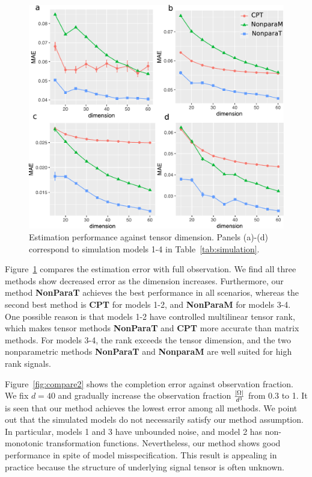 \documentclass{article}
\theoremstyle{plain}
\theoremstyle{definition}
\begin{document}
\begin{figure}[h!]
\includegraphics[width=.45\textwidth]{figure/fig1-4.pdf}
\vspace{-.4cm}
\caption{Estimation performance against tensor dimension. Panels (a)-(d) correspond to simulation models 1-4 in Table~\ref{tab:simulation}.}\label{fig:compare1}
\vspace{-.2cm}
\end{figure}


Figure~\ref{fig:compare1} compares the estimation error with full observation. We find all three methods show decreased error as the dimension increases. Furthermore, our method {\bf NonParaT} achieves the best performance in all scenarios, whereas the second best method is {\bf CPT} for models 1-2, and {\bf NonParaM} for models 3-4. One possible reason is that models 1-2 have controlled multilinear tensor rank, which makes tensor methods {\bf NonParaT} and {\bf CPT} more accurate than matrix methods. For models 3-4, the rank exceeds the tensor dimension, and the two nonparametric methods {\bf NonParaT} and {\bf NonparaM} are well suited for high rank signals. 



Figure~\ref{fig:compare2} shows the completion error against observation fraction. We fix $d=40$ and gradually increase the observation fraction ${|\Omega|\over d^3}$ from 0.3 to 1. It is seen that our method achieves the lowest error among all methods. %
We point out that the simulated models do not necessarily satisfy our method assumption. In particular, models 1 and 3 have unbounded noise, and model 2 has non-monotonic transformation functions. Nevertheless, our method shows good performance in spite of model misspecification. This result is appealing in practice because the structure of underlying signal tensor is often unknown. 
\end{document}
